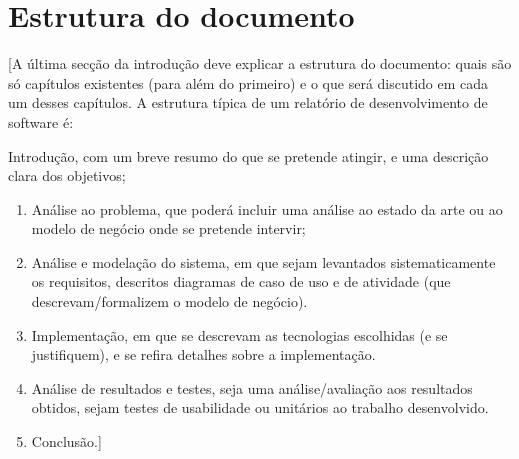 \section{Estrutura do documento}
[A última secção da introdução deve explicar a estrutura do documento: quais são só capítulos existentes (para além do primeiro) e o que será discutido em cada um desses capítulos. A estrutura típica de um relatório de desenvolvimento de software é: 

Introdução, com um breve resumo do que se pretende atingir, e uma descrição clara dos objetivos;

\begin{enumerate}
    \item Análise ao problema, que poderá incluir uma análise ao estado da arte ou ao modelo de negócio onde se pretende intervir;
    \item Análise e modelação do sistema, em que sejam levantados sistematicamente os requisitos, descritos diagramas de caso de uso e de atividade (que descrevam/formalizem o modelo de negócio). 
    \item Implementação, em que se descrevam as tecnologias escolhidas (e se justifiquem), e se refira detalhes sobre a implementação.
    \item Análise de resultados e testes, seja uma análise/avaliação aos resultados obtidos, sejam testes de usabilidade ou unitários ao trabalho desenvolvido. 
    \item Conclusão.]
\end{enumerate}{}
